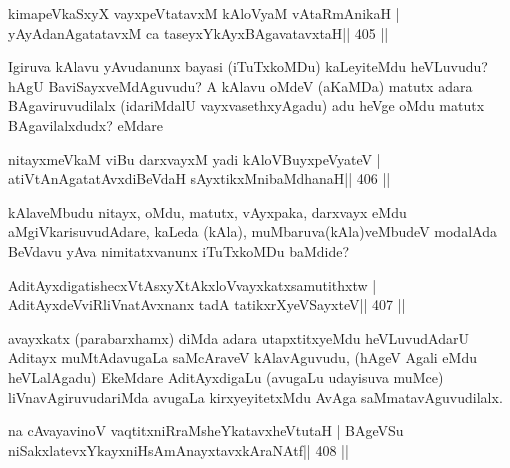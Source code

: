 
\begin{shl}
kimapeVkaSxyX vayxpeVtatavxM kAloV\s yaM vAtaRmAnikaH |
yAyAdanAgatatavxM ca taseyxYkAyxBAgavatavxtaH\hfill || 405 ||
\end{shl}

\begin{artha}
Igiruva kAlavu yAvudanunx bayasi (iTuTxkoMDu) kaLeyiteMdu heVLuvudu? hAgU BaviSayxveMdAguvudu? A kAlavu oMdeV (aKaMDa) matutx adara BAgaviruvudilalx (idariMdalU vayxvasethxyAgadu) adu heVge oMdu matutx BAgavilalxdudx? eMdare
\end{artha}

\begin{shl}
nitayxmeVkaM viBu darxvayxM yadi kAloV\s BuyxpeVyateV |
atiVtAnAgatatAvxdiBeVdaH sAyxtikxMnibaMdhanaH\hfill || 406 ||
\end{shl}

\begin{artha}
kAlaveMbudu nitayx, oMdu, matutx, vAyxpaka, darxvayx eMdu aMgiVkarisuvudAdare, kaLeda (kAla), muMbaruva(kAla)veMbudeV modalAda BeVdavu yAva nimitatxvanunx iTuTxkoMDu baMdide?
\end{artha}

\begin{shl}
AditAyxdigatishecxVtAsxyXtAkxloV\s vayxkatxsamutithxtw |
AditAyxdeVviRliVnatAvxnanx tadA tatikxrXyeVSayxteV\hfill || 407 ||
\end{shl}

\begin{artha}
avayxkatx (parabarxhamx) diMda adara utapxtitxyeMdu heVLuvudAdarU Aditayx \break 	muMtAdavugaLa saMcAraveV kAlavAguvudu, (hAgeV Agali eMdu heVLalAgadu) EkeMdare AditAyxdigaLu (avugaLu udayisuva muMce) liVnavAgiruvudariMda avugaLa kirxyeyitetxMdu AvAga saMmatavAguvudilalx.
\end{artha}


\begin{shl}
na cAvayavinoV vaqtitxniRraMsheYkatavxheVtutaH |
BAgeVSu niSakxlatevxYkayxniHsAmAnayxtavxkAraNAtf\hfill || 408 ||
\end{shl}

